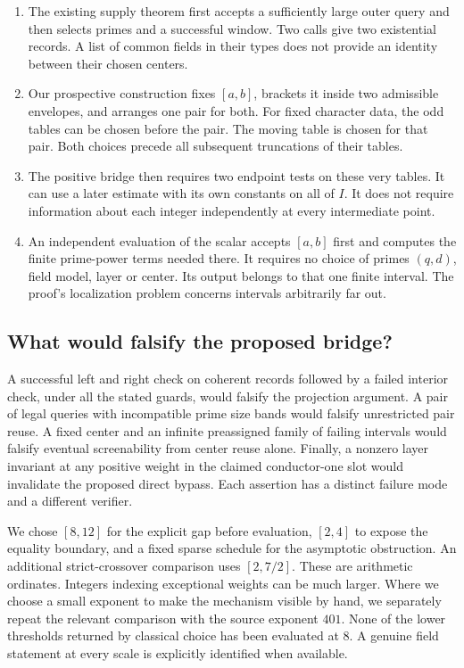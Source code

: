 \documentclass[12pt,letterpaper]{article}
\begin{document}
\begin{enumerate}
\item The existing supply theorem first accepts a sufficiently large outer query and then selects primes and a successful window. Two calls give two existential records. A list of common fields in their types does not provide an identity between their chosen centers.
\item Our prospective construction fixes \([a,b]\), brackets it inside two admissible envelopes, and arranges one pair for both. For fixed character data, the odd tables can be chosen before the pair. The moving table is chosen for that pair. Both choices precede all subsequent truncations of their tables.
\item The positive bridge then requires two endpoint tests on these very tables. It can use a later estimate with its own constants on all of \(I\). It does not require information about each integer independently at every intermediate point.
\item An independent evaluation of the scalar accepts \([a,b]\) first and computes the finite prime-power terms needed there. It requires no choice of primes \((q,d)\), field model, layer or center. Its output belongs to that one finite interval. The proof's localization problem concerns intervals arbitrarily far out.
\end{enumerate}

\subsection{What would falsify the proposed bridge?}
A successful left and right check on coherent records followed by a failed interior check, under all the stated guards, would falsify the projection argument. A pair of legal queries with incompatible prime size bands would falsify unrestricted pair reuse. A fixed center and an infinite preassigned family of failing intervals would falsify eventual screenability from center reuse alone. Finally, a nonzero layer invariant at any positive weight in the claimed conductor-one slot would invalidate the proposed direct bypass. Each assertion has a distinct failure mode and a different verifier.

We chose \([8,12]\) for the explicit gap before evaluation, \([2,4]\) to expose the equality boundary, and a fixed sparse schedule for the asymptotic obstruction. An additional strict-crossover comparison uses \([2,7/2]\). These are arithmetic ordinates. Integers indexing exceptional weights can be much larger. Where we choose a small exponent to make the mechanism visible by hand, we separately repeat the relevant comparison with the source exponent \(401\). None of the lower thresholds returned by classical choice has been evaluated at 8. A genuine field statement at every scale is explicitly identified when available.
\end{document}
